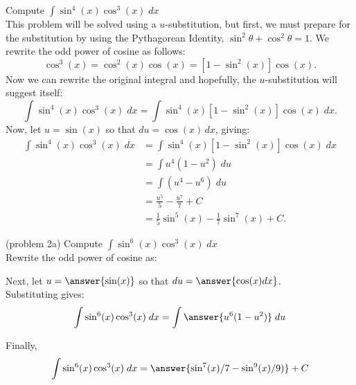 \documentclass{ximera}
\begin{document}
\begin{example}[example 2]
Compute $\displaystyle{\int \sin^4(x)\cos^3(x) \; dx}$\\
This problem will be solved using a $u$-substitution, but first, we must
prepare for the substitution by using the Pythagorean 
Identity, $\sin^2 \theta + \cos^2 \theta = 1$. We rewrite the odd power of cosine as follows:
\[
\cos^3(x) = \cos^2(x) \cos(x) = \left[1 - \sin^2(x)\right] \cos(x).
\]
Now we can rewrite the original integral and hopefully, the $u$-substitution will suggest itself:
\[
\int \sin^4(x)\cos^3(x) \; dx = \int \sin^4(x)\left[1 - \sin^2(x)\right] \cos(x) \; dx.
\]
Now, let $u = \sin(x)$ so that  $du = \cos(x) \, dx$, giving:
\begin{align*}
\int \sin^4(x)\cos^3(x) \; dx &= \int \sin^4(x)\left[1 - \sin^2(x)\right] \cos(x) \; dx\\
   &= \int u^4 (1-u^2) \; du\\
   &= \int (u^4 -u^6) \; du\\
  &= \frac{u^5}{5} - \frac{u^7}{7} + C \\
  &= \frac15 \sin^5(x) - \frac17 \sin^7(x) + C.
\end{align*}
  
\end{example}



\begin{problem}(problem 2a)
Compute $\displaystyle{\int \sin^6(x)\cos^3(x) \; dx}$\\
Rewrite the odd power of cosine as:
\begin{multipleChoice}
\end{multipleChoice}

Next, let $u = \answer{\sin(x)}$ so that $du = \answer{\cos(x) dx}$.\\

Substituting gives: 
\[
\int \sin^6(x)\cos^3(x) \; dx= \int \answer{u^6(1-u^2)} \; du
\]

Finally, 
\[
\int \sin^6(x)\cos^3(x) \; dx= \answer{\sin^7(x)/7 - \sin^9(x)/9)} + C
\]

\end{problem}
\end{document}
